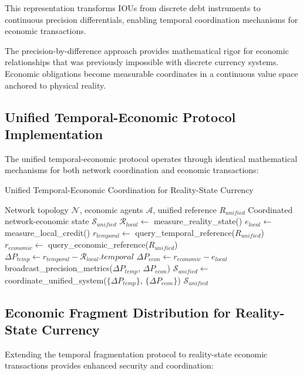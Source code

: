 \documentclass[12pt,a4paper]{article}
\begin{document}
This representation transforms IOUs from discrete debt instruments to continuous precision differentials, enabling temporal coordination mechanisms for economic transactions.

The precision-by-difference approach provides mathematical rigor for economic relationships that was previously impossible with discrete currency systems. Economic obligations become measurable coordinates in a continuous value space anchored to physical reality.

\subsection{Unified Temporal-Economic Protocol Implementation}

The unified temporal-economic protocol operates through identical mathematical mechanisms for both network coordination and economic transactions:

\begin{algorithm}
\caption{Unified Temporal-Economic Coordination for Reality-State Currency}
\begin{algorithmic}[1]
\Require Network topology $\mathcal{N}$, economic agents $\mathcal{A}$, unified reference $R_{unified}$
\Ensure Coordinated network-economic state $\mathcal{S}_{unified}$
    \State $\mathcal{R}_{local} \leftarrow$ measure\_reality\_state()
    \State $e_{local} \leftarrow$ measure\_local\_credit()
    \State $r_{temporal} \leftarrow$ query\_temporal\_reference($R_{unified}$)
    \State $r_{economic} \leftarrow$ query\_economic\_reference($R_{unified}$)
    \State $\Delta P_{temp} \leftarrow r_{temporal} - \mathcal{R}_{local}.temporal$
    \State $\Delta P_{econ} \leftarrow r_{economic} - e_{local}$
    \State broadcast\_precision\_metrics($\Delta P_{temp}$, $\Delta P_{econ}$)
\EndFor
\State $\mathcal{S}_{unified} \leftarrow$ coordinate\_unified\_system($\{\Delta P_{temp}\}$, $\{\Delta P_{econ}\}$)
\State \Return $\mathcal{S}_{unified}$
\end{algorithmic}
\end{algorithm}

\subsection{Economic Fragment Distribution for Reality-State Currency}

Extending the temporal fragmentation protocol to reality-state economic transactions provides enhanced security and coordination:
\end{document}
